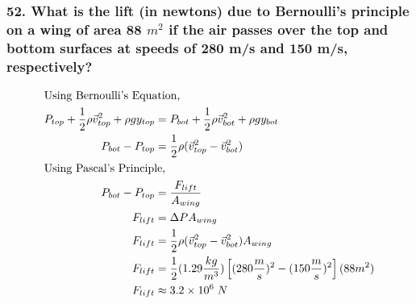\documentclass{article}
\begin{document}
\subsubsection*{
    52. What is the lift (in newtons) due to Bernoulli’s principle on a wing of
    area 88 $m^2$ if the air passes over the top and bottom surfaces at speeds of
    280 m/s and 150 m/s, respectively?
}
\begin{align*}
    \intertext{Using Bernoulli's Equation,}
    P_{top} + \frac 1 2 \rho\vec v_{top}^2 + \rho gy_{top} &= P_{bot} + \frac 1 2 \rho\vec v_{bot}^2 + \rho gy_{bot} \\
    P_{bot} - P_{top} &= \frac 1 2 \rho(\vec v^2_{top} - \vec v^2_{bot}) \\
    \intertext{Using Pascal's Principle,} 
    P_{bot} - P_{top} &= \displaystyle\frac{F_{lift}}{A_{wing}} \\
    F_{lift} &= \Delta PA_{wing} \\ 
    F_{lift} &= \frac 1 2 \rho (\vec v^2_{top} - \vec v^2_{bot})A_{wing} \\
    F_{lift} &= \frac 1 2 (1.29 \displaystyle\frac{kg}{m^3})\left[(280 \frac m s)^2 -
    (150 \frac m s)^2\right](88m^2) \\
    F_{lift} &\approx 3.2 \times 10^6\;N
\end{align*}
\end{document}
